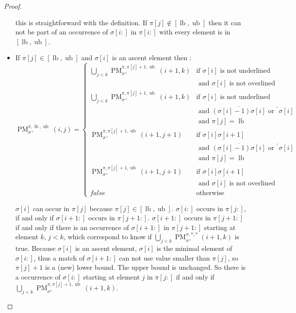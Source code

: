 \documentclass[a4paper]{llncs}
\newcommand{\ptext}{\pi}
\newcommand{\pmotif}{\sigma}
\newcommand{\pbmotif}{\pmotif^+}
\DeclareMathOperator{\PMa}{PM}
\newcommand{\PM}[6]{\PMa_{{#1}}^{{#2},{#3},{#4}}({#5},{#6})}
\DeclareMathOperator{\lb}{lb}
\DeclareMathOperator{\ub}{ub}
\begin{document}
\begin{proof}
\begin{itemize}
	this is straightforward with the definition. If $\ptext[j] \notin [\lb,\ub]$ then it can not be part of an occurrence of  $\pmotif[i:]$ in $\ptext[i:]$ with every element is in $[\lb,\ub]$.
	
	\item If $\ptext[j] \in [\lb,\ub]$ and $\pmotif[i]$ is an ascent element then :
	$$
	\PM{\pbmotif}{\ptext}{\lb}{\ub}{i}{j}=
	\begin{cases}
		\bigcup_{j<k} \PM{\pbmotif}{\ptext}{\ptext[j]+1}{\ub}{i+1}{k}
			& \text{if $\pmotif[i]$ is not underlined } \\
			& \text{ and $\pmotif[i]$ is not overlined} \\
		\bigcup_{j<k} \PM{\pbmotif}{\ptext}{\ptext[j]+1}{\ub}{i+1}{k}
			& \text{if $\pmotif[i]$ is not underlined } \\
			& \text{ and $\overline{(\pmotif[i]-1)\pmotif[i]}$ or $^\ulcorner{\pmotif[i]}$}\\
			& \text{ and $\ptext[j]=\lb$} \\
		\PM{\pbmotif}{\ptext}{\ptext[j]+1}{\ub}{i+1}{j+1}
			& \text{if $\underline{\pmotif[i]\pmotif[i+1]}$ } \\
			& \text{ and $\overline{(\pmotif[i]-1)\pmotif[i]}$ or $^\ulcorner{\pmotif[i]}$}\\
			& \text{ and $\ptext[j]=\lb$} \\
		\PM{\pbmotif}{\ptext}{\ptext[j]+1}{\ub}{i+1}{j+1}
			& \text{if $\underline{\pmotif[i]\pmotif[i+1]}$ } \\
			& \text{ and $\pmotif[i]$ is not overlined} \\
		false & \text{otherwise}

	\end{cases}
	$$	
	
	$\pmotif[i]$ can occur in $\ptext[j]$ because $\ptext[j] \in [\lb,\ub]$. $\pmotif[i:]$ occurs in $\ptext[j:]$, if and only if $\pmotif[i+1:]$ occurs in $\ptext[j+1:]$. $\pmotif[i+1:]$ occurs in $\ptext[j+1:]$ if and only if there is an occurrence of $\pmotif[i+1:]$ in $\ptext[j+1:]$ starting at element $k$, $j<k$, which correspond to know if $\bigcup_{j<k} \PM{\pbmotif}{\ptext}{*}{*}{i+1}{k}$ is true. Because $\pmotif[i]$ is an ascent element,  $\pmotif[i]$ is the minimal element of $\pmotif[i:]$, thus a match of $\pmotif[i+1:]$ can not use value smaller than $\ptext[j]$, so $\ptext[j]+1$ is a (new) lower bound. The upper bound is unchanged. So there is a occurrence of  $\pmotif[i:]$ starting at element $j$ in $\ptext[j:]$ if and only if $\bigcup_{j<k} \PM{\pbmotif}{\ptext}{\ptext[j]+1}{\ub}{i+1}{k}$. 
	

\end{itemize}
\end{proof}
\end{document}
